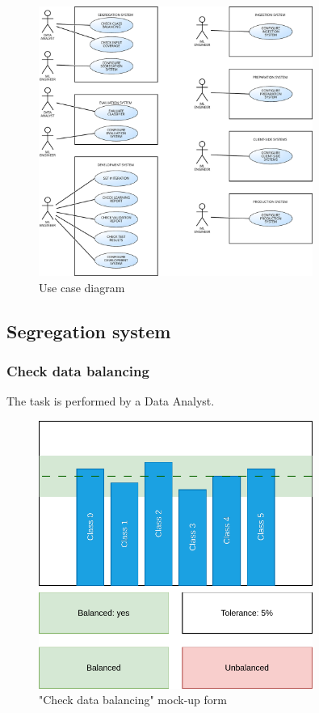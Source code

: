 \begin{figure}[H]
\centering
\includegraphics[width=0.8\textwidth]{figures/Use Cases.pdf}
\caption{Use case diagram}
\label{fig:use_cases}
\end{figure}

\subsection{Segregation system}

\subsubsection{Check data balancing}

The task is performed by a Data Analyst.

\begin{figure}[H]
\centering
\includegraphics[width=0.8\textwidth]{figures/check_data_balancing.pdf}
\caption{"Check data balancing" mock-up form}
\end{figure}

